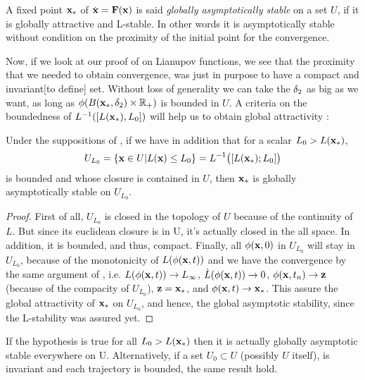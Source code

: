 \begin{definition}
    A fixed point $\mathbf{x}_*$ of $\dot{\mathbf{x}}=\mathbf{F}(\mathbf{x})$ is said \emph{globally asymptotically stable} on a set $U$, if it is globally attractive and L-stable. In other words it is asymptotically stable without condition on the proximity of the initial point for the convergence.
\end{definition}
Now, if we look at our proof of  on Lianupov functions, we see that the proximity that we needed to obtain convergence, was just in purpose to have a compact and invariant[to define] set. Without loss of generality we can take the $\delta_2$ as big as we want, as long as $\phi(B(\mathbf{x}_*,\delta_2)\times\mathbb{R}_+)$ is bounded in $U$. A criteria on the boundedness of $L^{-1}([L(\mathbf{x}_*),L_0])$ will help us to obtain global attractivity :
\begin{theoreme}
Under the suppositions of , if we have in addition that for a scalar $L_0>L(\mathbf{x}_*)$,
\[ U_{L_0} = \{ \mathbf{x}\in U | L(\mathbf{x}) \leq L_0\} = L^{-1}\big([L(\mathbf{x}_*);L_0]\big) \]
is bounded and whose closure is contained in $U$, then $\mathbf{x}_*$ is globally asymptotically stable on $U_{L_0}$.
\end{theoreme}
\begin{proof}
First of all, $U_{L_0}$ is closed in the topology of $U$ because of the continuity of $L$. But since its euclidean closure is in U, it's actually closed in the all space. In addition, it is bounded, and thus, compact. Finally, all $\phi(\mathbf{x},0)$ in $U_{L_0}$ will stay in $U_{L_0}$, because of the monotonicity of $L(\phi(\mathbf{x},t))$ and we have the convergence by the same argument of , i.e. $L(\phi(\mathbf{x},t))\to L_\infty$, $\dot{L}(\phi(\mathbf{x},t))\to 0$, $\phi(\mathbf{x},t_n)\to \mathbf{z}$ (because of the compacity of $U_{L_0}$), $\mathbf{z}=\mathbf{x}_*$, and $\phi(\mathbf{x},t)\to \mathbf{x}_*$. This assure the global attractivity of $\mathbf{x}_*$ on $U_{L_0}$, and hence, the global asymptotic stability, since the L-stability was assured yet.
\end{proof}

\begin{remarque}
If the hypothesis is true for all $L_0>L(\mathbf{x}_*)$ then it is actually globally asymptotic stable everywhere on U. Alternatively, if a set $U_0\subset U$ (possibly $U$ itself), is invariant and each trajectory is bounded, the same result hold.
\end{remarque}